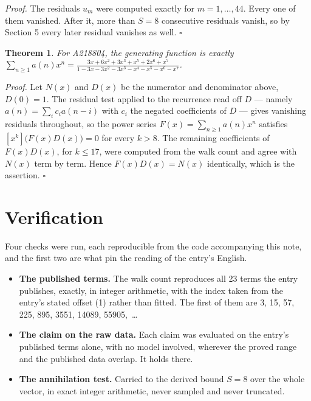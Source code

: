 \documentclass[11pt]{article}
\newtheorem{theorem}{Theorem}
\theoremstyle{definition}
\begin{document}
{\itshape Proof.} The residuals $u_m$ were computed exactly for $m = 1,\dots,44$. Every one of them vanished. After it, more than $S = 8$ consecutive residuals vanish, so by Section 5 every later residual vanishes as well. $\square$

\begin{theorem} For A218804, the generating function is exactly $\sum_{n\ge 1} a(n)x^n = \frac{3x + 6x^{2} + 3x^{3} + x^{5} + 2x^{6} + x^{7}}{1 - 3x - 3x^{2} - 3x^{3} - x^{4} - x^{5} - x^{6} - x^{7}}$.\end{theorem}

{\itshape Proof.} Let $N(x)$ and $D(x)$ be the numerator and denominator above, $D(0)=1$. The residual test applied to the recurrence read off $D$ --- namely $a(n) = \sum_i c_i a(n-i)$ with $c_i$ the negated coefficients of $D$ --- gives vanishing residuals throughout, so the power series $F(x)=\sum_{n\ge 1}a(n)x^n$ satisfies $[x^k]\bigl(F(x)D(x)\bigr) = 0$ for every $k > 8$. The remaining coefficients of $F(x)D(x)$, for $k \le 17$, were computed from the walk count and agree with $N(x)$ term by term. Hence $F(x)D(x) = N(x)$ identically, which is the assertion. $\square$

\section{Verification}

Four checks were run, each reproducible from the code accompanying this note, and the first two are what pin the reading of the entry's English.

\begin{itemize}

\item {\bfseries The published terms.} The walk count reproduces all 23 terms the entry publishes, exactly, in integer arithmetic, with the index taken from the entry's stated offset (1) rather than fitted. The first of them are 3, 15, 57, 225, 895, 3551, 14089, 55905,~\dots

\item {\bfseries The claim on the raw data.} Each claim was evaluated on the entry's published terms alone, with no model involved, wherever the proved range and the published data overlap. It holds there.

\item {\bfseries The annihilation test.} Carried to the derived bound $S = 8$ over the whole vector, in exact integer arithmetic, never sampled and never truncated.

\end{itemize}
\end{document}

